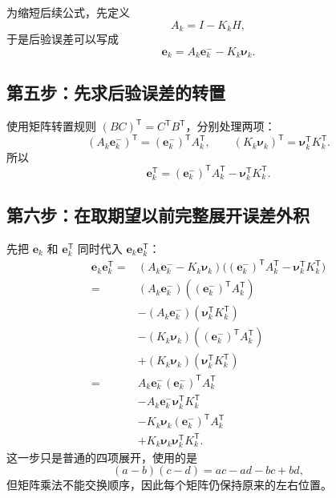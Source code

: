\documentclass[UTF8,a4paper,11pt]{ctexart}
\newcommand{\prior}{^{-}}
\newcommand{\transpose}{^{\mathsf T}}
\begin{document}
为缩短后续公式，先定义
\begin{equation}
A_k=I-K_kH,
\end{equation}
于是后验误差可以写成
\begin{equation}
\bm e_k=A_k\bm e_k\prior-K_k\bm\nu_k.
\end{equation}

\subsection*{第五步：先求后验误差的转置}

使用矩阵转置规则 $(BC)\transpose=C\transpose B\transpose$，分别处理两项：
\begin{equation}
(A_k\bm e_k\prior)\transpose
=(\bm e_k\prior)\transpose A_k\transpose,
\qquad
(K_k\bm\nu_k)\transpose
=\bm\nu_k\transpose K_k\transpose.
\end{equation}
所以
\begin{equation}
\bm e_k\transpose
=(\bm e_k\prior)\transpose A_k\transpose
-\bm\nu_k\transpose K_k\transpose.
\end{equation}

\subsection*{第六步：在取期望以前完整展开误差外积}

先把 $\bm e_k$ 和 $\bm e_k\transpose$ 同时代入 $\bm e_k\bm e_k\transpose$：
\begin{align}
\bm e_k\bm e_k\transpose
={}&(A_k\bm e_k\prior-K_k\bm\nu_k)
\bigl((\bm e_k\prior)\transpose A_k\transpose
-\bm\nu_k\transpose K_k\transpose\bigr)\\
={}&(A_k\bm e_k\prior)
((\bm e_k\prior)\transpose A_k\transpose)\\
&-(A_k\bm e_k\prior)
(\bm\nu_k\transpose K_k\transpose)\\
&-(K_k\bm\nu_k)
((\bm e_k\prior)\transpose A_k\transpose)\\
&+(K_k\bm\nu_k)
(\bm\nu_k\transpose K_k\transpose)\\
={}&A_k\bm e_k\prior(\bm e_k\prior)\transpose A_k\transpose\\
&-A_k\bm e_k\prior\bm\nu_k\transpose K_k\transpose\\
&-K_k\bm\nu_k(\bm e_k\prior)\transpose A_k\transpose\\
&+K_k\bm\nu_k\bm\nu_k\transpose K_k\transpose.
\end{align}
这一步只是普通的四项展开，使用的是
\begin{equation}
(a-b)(c-d)=ac-ad-bc+bd,
\end{equation}
但矩阵乘法不能交换顺序，因此每个矩阵仍保持原来的左右位置。
\end{document}

